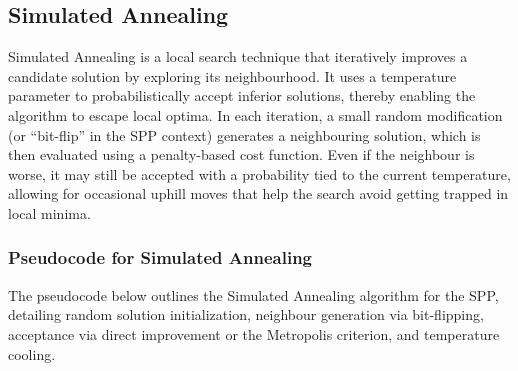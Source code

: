 \documentclass[12pt]{article}
\begin{document}
\subsection{Simulated Annealing}
Simulated Annealing is a local search technique that iteratively improves a candidate solution by exploring its neighbourhood. It uses a temperature parameter to probabilistically accept inferior solutions, thereby enabling the algorithm to escape local optima.
In each iteration, a small random modification (or “bit-flip” in the SPP context) generates a neighbouring solution, which is then evaluated using a penalty-based cost function.
Even if the neighbour is worse, it may still be accepted with a probability tied to the current temperature, allowing for occasional uphill moves that help the search avoid getting trapped in local minima.
\subsubsection{Pseudocode for Simulated Annealing}
The pseudocode below outlines the Simulated Annealing algorithm for the SPP, detailing random solution initialization, neighbour generation via bit-flipping, acceptance via direct improvement or the Metropolis criterion, and temperature cooling.
\end{document}
